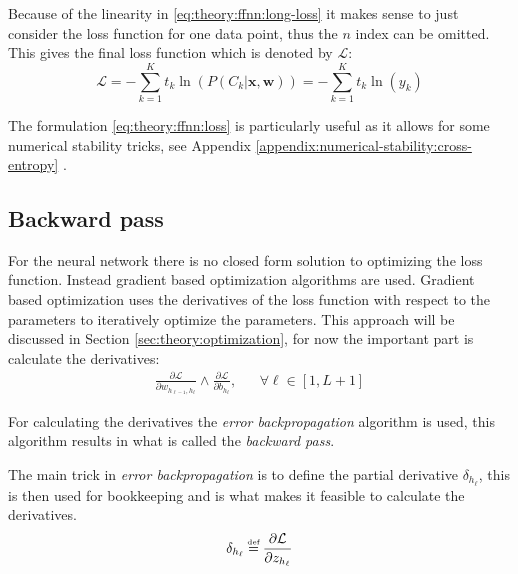 Because of the linearity in \eqref{eq:theory:ffnn:long-loss} it makes sense to just consider the loss function for one data point, thus the $n$ index can be omitted. This gives the final loss function which is denoted by $\mathcal{L}$:
\begin{equation}
\mathcal{L} = - \sum_{k=1}^K t_{k} \ln\left( P(C_{k} | \mathbf{x}, \mathbf{w})\right) =  - \sum_{k=1}^K t_k \ln(y_k)
\label{eq:theory:ffnn:loss}
\end{equation}

The formulation \eqref{eq:theory:ffnn:loss} is particularly useful as it allows for some numerical stability tricks, see Appendix \ref{appendix:numerical-stability:cross-entropy} .

\subsection{Backward pass}

For the neural network there is no closed form solution to optimizing the loss function. Instead gradient based optimization algorithms are used. Gradient based optimization uses the derivatives of the loss function with respect to the parameters to iteratively optimize the parameters. This approach will be discussed in Section \ref{sec:theory:optimization}, for now the important part is calculate the derivatives:
\begin{equation}
\begin{aligned}
\frac{\partial \mathcal{L}}{\partial w_{h_{\ell-1}, h_\ell}} \wedge \frac{\partial \mathcal{L}}{\partial b_{h_\ell}}, && \forall \ell \in [1, L + 1]
\end{aligned}
\label{eq:theory:ffnn:bprop-problem}
\end{equation}

For calculating the derivatives the \textit{error backpropagation} algorithm is used, this algorithm results in what is called the \textit{backward pass}.

The main trick in \textit{error backpropagation} is to define the partial derivative $\delta_{h_\ell}$, this is then used for bookkeeping and is what makes it feasible to calculate the derivatives.
\begin{equation}
\delta_{h_\ell} \defeq \frac{\partial \mathcal{L}}{\partial z_{h_\ell}}
\end{equation}

